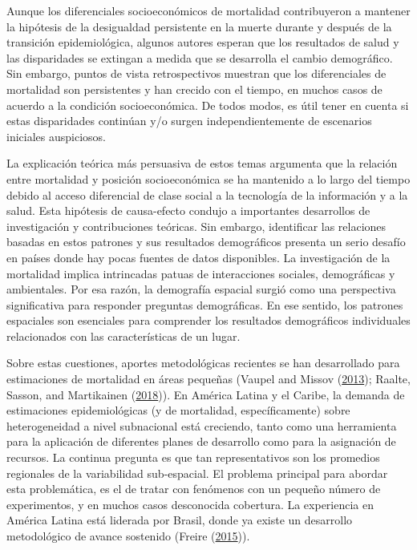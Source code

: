 \documentclass[12pt,]{article}
\begin{document}
Aunque los diferenciales socioeconómicos de mortalidad contribuyeron a
mantener la hipótesis de la desigualdad persistente en la muerte durante
y después de la transición epidemiológica, algunos autores esperan que
los resultados de salud y las disparidades se extingan a medida que se
desarrolla el cambio demográfico. Sin embargo, puntos de vista
retrospectivos muestran que los diferenciales de mortalidad son
persistentes y han crecido con el tiempo, en muchos casos de acuerdo a
la condición socioeconómica. De todos modos, es útil tener en cuenta si
estas disparidades continúan y/o surgen independientemente de escenarios
iniciales auspiciosos.

La explicación teórica más persuasiva de estos temas argumenta que la
relación entre mortalidad y posición socioeconómica se ha mantenido a lo
largo del tiempo debido al acceso diferencial de clase social a la
tecnología de la información y a la salud. Esta hipótesis de
causa-efecto condujo a importantes desarrollos de investigación y
contribuciones teóricas. Sin embargo, identificar las relaciones basadas
en estos patrones y sus resultados demográficos presenta un serio
desafío en países donde hay pocas fuentes de datos disponibles. La
investigación de la mortalidad implica intrincadas patuas de
interacciones sociales, demográficas y ambientales. Por esa razón, la
demografía espacial surgió como una perspectiva significativa para
responder preguntas demográficas. En ese sentido, los patrones
espaciales son esenciales para comprender los resultados demográficos
individuales relacionados con las características de un lugar.

Sobre estas cuestiones, aportes metodológicas recientes se han
desarrollado para estimaciones de mortalidad en áreas pequeñas (Vaupel
and Missov (\protect\hyperlink{ref-Vaupel_Missov_2013}{2013}); Raalte,
Sasson, and Martikainen
(\protect\hyperlink{ref-vanRaalte_Sasson_Martikainen_2018}{2018})). En
América Latina y el Caribe, la demanda de estimaciones epidemiológicas
(y de mortalidad, específicamente) sobre heterogeneidad a nivel
subnacional está creciendo, tanto como una herramienta para la
aplicación de diferentes planes de desarrollo como para la asignación de
recursos. La continua pregunta es que tan representativos son los
promedios regionales de la variabilidad sub-espacial. El problema
principal para abordar esta problemática, es el de tratar con fenómenos
con un pequeño número de experimentos, y en muchos casos desconocida
cobertura. La experiencia en América Latina está liderada por Brasil,
donde ya existe un desarrollo metodológico de avance sostenido (Freire
(\protect\hyperlink{ref-FreireEtAl2015}{2015})).
\end{document}
